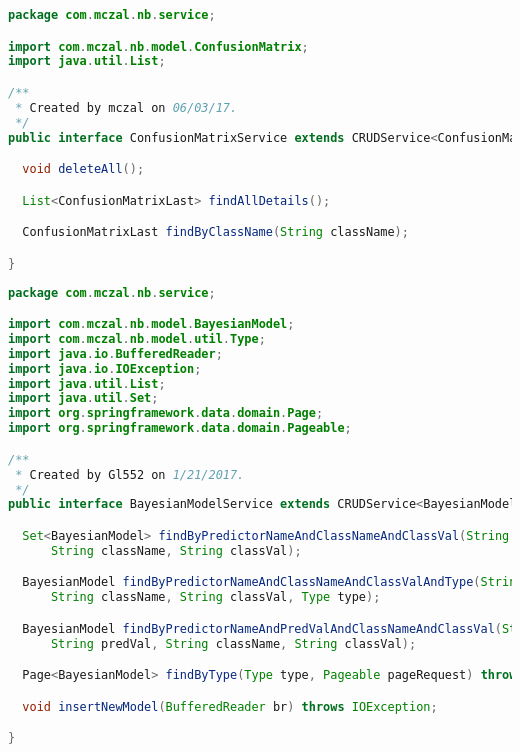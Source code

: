 \begin{lstlisting}[language=Java,basicstyle=\tiny,caption=ConfusionMatrixService.java]
package com.mczal.nb.service;

import com.mczal.nb.model.ConfusionMatrix;
import java.util.List;

/**
 * Created by mczal on 06/03/17.
 */
public interface ConfusionMatrixService extends CRUDService<ConfusionMatrix> {

  void deleteAll();

  List<ConfusionMatrixLast> findAllDetails();

  ConfusionMatrixLast findByClassName(String className);

}

\end{lstlisting}

\begin{lstlisting}[language=Java,basicstyle=\tiny,caption=BayesianModelService.java]
package com.mczal.nb.service;

import com.mczal.nb.model.BayesianModel;
import com.mczal.nb.model.util.Type;
import java.io.BufferedReader;
import java.io.IOException;
import java.util.List;
import java.util.Set;
import org.springframework.data.domain.Page;
import org.springframework.data.domain.Pageable;

/**
 * Created by Gl552 on 1/21/2017.
 */
public interface BayesianModelService extends CRUDService<BayesianModel> {

  Set<BayesianModel> findByPredictorNameAndClassNameAndClassVal(String predictorName,
      String className, String classVal);

  BayesianModel findByPredictorNameAndClassNameAndClassValAndType(String predictorName,
      String className, String classVal, Type type);

  BayesianModel findByPredictorNameAndPredValAndClassNameAndClassVal(String predictorName,
      String predVal, String className, String classVal);

  Page<BayesianModel> findByType(Type type, Pageable pageRequest) throws Exception;

  void insertNewModel(BufferedReader br) throws IOException;

}

\end{lstlisting}


